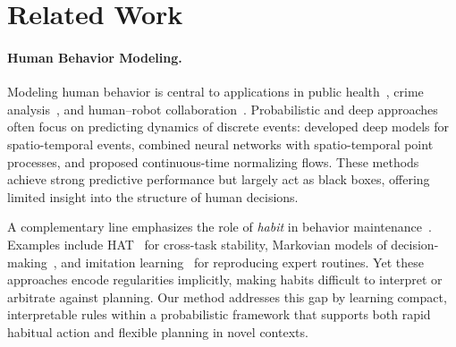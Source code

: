 \documentclass{article} %
\begin{document}



\section{Related Work}
\label{sec:related_work}

\paragraph{Human Behavior Modeling.}
Modeling human behavior is central to applications in public health~\citep{ferguson2007capturing, marsch2021digital}, crime analysis~\citep{savage2003human}, and human–robot collaboration~\citep{dragan2013policy, maeda2017probabilistic}. Probabilistic and deep approaches often focus on predicting dynamics of discrete events: \citet{shen2018stepdeep} developed deep models for spatio-temporal events, \citet{zhou2022neural} combined neural networks with spatio-temporal point processes, and \citet{chen2020neural} proposed continuous-time normalizing flows. These methods achieve strong predictive performance but largely act as black boxes, offering limited insight into the structure of human decisions.

A complementary line emphasizes the role of \emph{habit} in behavior maintenance~\citep{rothman2009reflective}. Examples include HAT~\citep{serra2018overcoming} for cross-task stability, Markovian models of decision-making~\citep{pentland1999modeling}, and imitation learning~\citep{ho2016generative, li2017infogail, duan2017one} for reproducing expert routines. Yet these approaches encode regularities implicitly, making habits difficult to interpret or arbitrate against planning. Our method addresses this gap by learning compact, interpretable rules within a probabilistic framework that supports both rapid habitual action and flexible planning in novel contexts.
\end{document}

